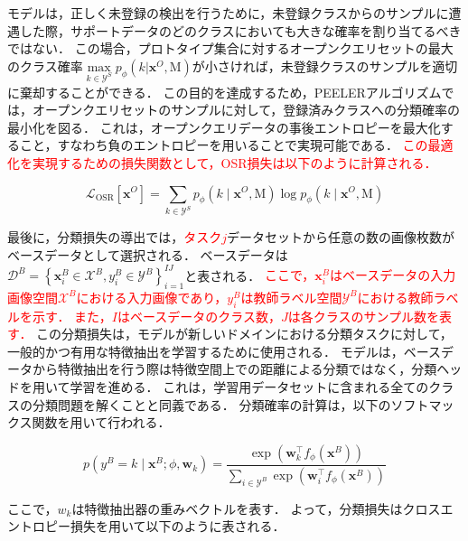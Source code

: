 \documentclass[a4paper,11pt,nomag]{jsreport}
\begin{document}
モデルは，正しく未登録の検出を行うために，未登録クラスからのサンプルに遭遇した際，サポートデータのどのクラスにおいても大きな確率を割り当てるべきではない．
この場合，プロトタイプ集合に対するオープンクエリセットの最大のクラス確率$\underset{k \in \mathcal{Y}^S}{\max} {p_{\phi}(k|\bm{x}^O, \mathrm{M})}$が小さければ，未登録クラスのサンプルを適切に棄却することができる．
この目的を達成するため，PEELERアルゴリズムでは，オープンクエリセットのサンプルに対して，登録済みクラスへの分類確率の最小化を図る．
これは，オープンクエリデータの事後エントロピーを最大化すること，すなわち負のエントロピーを用いることで実現可能である．
\textcolor{red}{この最適化を実現するための損失関数として，OSR損失は以下のように計算される．}

\begin{equation}
    \mathcal{L}_{\mathrm{OSR}}[\bm{x}^O]
                = \sum_{k \in \mathcal{Y}^S} {p_{\phi}(k \mid \bm{x}^O, \mathrm{M}) \log{p_{\phi}(k \mid \bm{x}^O, \mathrm{M})}}
\end{equation}

最後に，分類損失の導出では，\textcolor{red}{タスク$j$}データセットから任意の数の画像枚数がベースデータとして選択される．
ベースデータは$\mathcal{D}^B = \left\{ \bm{x}^B_i \in \mathcal{X}^B, y^B_i \in \mathcal{Y}^B \right\}^{I J}_{i=1}$と表される．
\textcolor{red}{ここで，$\bm{x}^B_i$はベースデータの入力画像空間$\mathcal{X}^B$における入力画像であり，$y^B_i$は教師ラベル空間$\mathcal{Y}^B$における教師ラベルを示す．
また，$I$はベースデータのクラス数，$J$は各クラスのサンプル数を表す．}
この分類損失は，モデルが新しいドメインにおける分類タスクに対して，一般的かつ有用な特徴抽出を学習するために使用される．
モデルは，ベースデータから特徴抽出を行う際は特徴空間上での距離による分類ではなく，分類ヘッドを用いて学習を進める．
これは，学習用データセットに含まれる全てのクラスの分類問題を解くことと同義である．
分類確率の計算は，以下のソフトマックス関数を用いて行われる．

\begin{equation}
    p(y^B=k \mid \bm{x}^B;\phi,\mathbf{w}_k) 
        = \frac{\exp(\mathbf{w}_k^{\top} f_{\phi}(\bm{x}^B))}{\sum_{i \in \mathcal{Y}^B} \exp(\mathbf{w}_{i}^{\top} f_{\phi}(\bm{x}^B))}
\end{equation}

\noindent
ここで，$w_k$は特徴抽出器の重みベクトルを表す．
よって，分類損失はクロスエントロピー損失を用いて以下のように表される．
\end{document}
